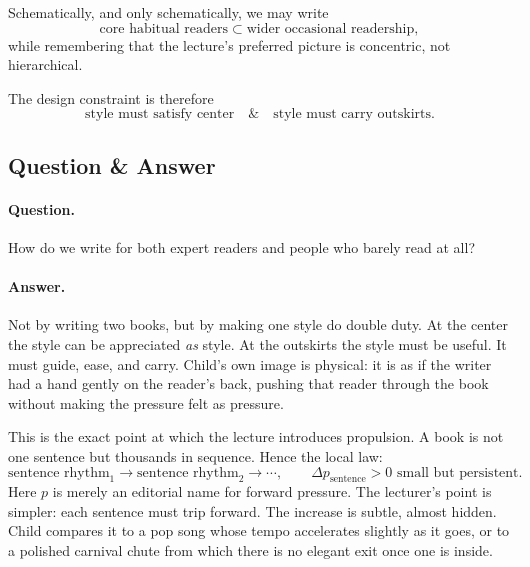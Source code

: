 Schematically, and only schematically, we may write
\begin{equation}
\text{core habitual readers} \subset \text{wider occasional readership},
\end{equation}
while remembering that the lecture's preferred picture is concentric, not hierarchical.

\begin{figure}[h]
\centering
{}
\end{figure}

The design constraint is therefore
\begin{equation}
\text{style must satisfy center} \quad \& \quad \text{style must carry outskirts}.
\end{equation}

\subsection{Question \& Answer}

\paragraph{Question.} How do we write for both expert readers and people who barely read at all?

\paragraph{Answer.} Not by writing two books, but by making one style do double duty. At the center the style can be appreciated \emph{as} style. At the outskirts the style must be useful. It must guide, ease, and carry. Child's own image is physical: it is as if the writer had a hand gently on the reader's back, pushing that reader through the book without making the pressure felt as pressure.

This is the exact point at which the lecture introduces propulsion. A book is not one sentence but thousands in sequence. Hence the local law:
\begin{equation}
\text{sentence rhythm}_1 \to \text{sentence rhythm}_2 \to \cdots,
\qquad
\Delta p_{\text{sentence}} > 0 \text{ small but persistent}.
\end{equation}
Here \(p\) is merely an editorial name for forward pressure. The lecturer's point is simpler: each sentence must trip forward. The increase is subtle, almost hidden. Child compares it to a pop song whose tempo accelerates slightly as it goes, or to a polished carnival chute from which there is no elegant exit once one is inside.

